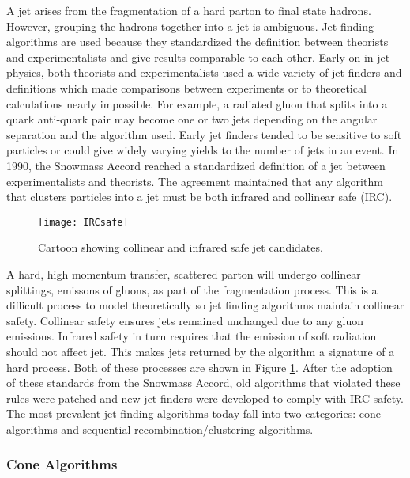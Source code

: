 A jet arises from the fragmentation of a hard parton to final state hadrons.  However, grouping the hadrons together into a jet is ambiguous.  Jet finding algorithms are used because they standardized the definition between theorists and experimentalists and give results comparable to each other. Early on in jet physics, both theorists and experimentalists used a wide variety of jet finders and definitions which made comparisons between experiments or to theoretical calculations nearly impossible\cite{Atkin:2015msa}.  For example, a radiated gluon that splits into a quark anti-quark pair may become one or two jets depending on the angular separation and the algorithm used.  Early jet finders tended to be sensitive to soft particles or could give widely varying yields to the number of jets in an event.  In 1990, the Snowmass Accord\cite{Huth:217490} reached a standardized definition of a jet between experimentalists and theorists.  The agreement maintained that any algorithm that clusters particles into a jet must be both infrared and collinear safe (IRC).  

\begin{figure}[h]
\texttt{[image: IRCsafe]}
\centering
\caption{Cartoon showing collinear and infrared safe jet candidates\cite{Blazey:2000qt}.}
\label{fig:IRCsafe}
\end{figure}

A hard, high momentum transfer, scattered parton will undergo collinear splittings, emissons of gluons, as part of the fragmentation process.  This is a difficult process to model theoretically so jet finding algorithms maintain collinear safety.
Collinear safety ensures jets remained unchanged due to any gluon emissions.  Infrared safety in turn requires that the emission of soft radiation should not affect jet.  This makes jets returned by the algorithm  a signature of a hard process.  Both of these processes are shown in Figure \ref{fig:IRCsafe}. After the adoption of these standards from the Snowmass Accord, old algorithms that violated these rules were patched and new jet finders were developed to comply with IRC safety.  The most prevalent jet finding algorithms today fall into two categories: cone algorithms and sequential recombination/clustering algorithms.

\subsubsection{Cone Algorithms}

